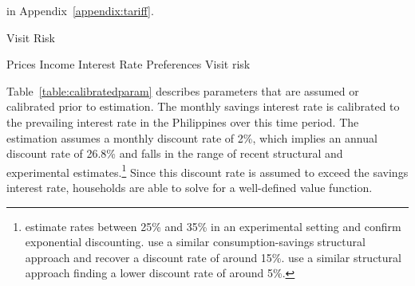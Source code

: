\documentclass[12pt]{article}
\begin{document}


 in Appendix~\ref{appendix:tariff}. 



Visit Risk




Prices
Income
Interest Rate
Preferences
Visit risk







Table~\ref{table:calibratedparam} describes parameters that are assumed or calibrated prior to estimation.  The monthly savings interest rate is calibrated to the prevailing interest rate in the Philippines over this time period.  The estimation assumes a monthly discount rate of 2\%, which implies an annual discount rate of 26.8\% and falls in the range of recent structural and experimental estimates.\footnote{\cite{andreoni2012estimating} estimate rates between 25\% and 35\% in an experimental setting and confirm exponential discounting.  \cite{laibson2007estimating} use a similar consumption-savings structural approach and recover a discount rate of around 15\%.  \cite{gourinchas2002consumption} use a similar structural approach finding a lower discount rate of around 5\%.}  Since this discount rate is assumed to exceed the savings interest rate, households are able to solve for a well-defined value function.
\end{document}
